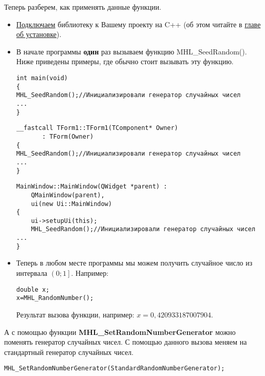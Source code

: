 Теперь разберем, как применять данные функции.

\begin{itemize}
\item \hyperref[section_install]{Подключаем} библиотеку к Вашему проекту на C++ (об этом читайте в \hyperref[section_install]{главе об установке}).
\item В начале программы \textbf{один} раз вызываем функцию MHL\_SeedRandom(). Ниже приведены примеры, где обычно стоит вызывать эту функцию.

\begin{lstlisting}[label=random_console,caption=Применение MHL\_SeedRandom для консольного приложения]
int main(void)
{
MHL_SeedRandom();//Инициализировали генератор случайных чисел
...
} 
\end{lstlisting}

\begin{lstlisting}[label=random_cbuilder,caption=Применение MHL\_SeedRandom для C++Builder]
__fastcall TForm1::TForm1(TComponent* Owner)
       : TForm(Owner)
{
MHL_SeedRandom();//Инициализировали генератор случайных чисел
...
}
\end{lstlisting}

\begin{lstlisting}[label=random_qt,caption=Применение MHL\_SeedRandom для Qt]
MainWindow::MainWindow(QWidget *parent) :
    QMainWindow(parent),
    ui(new Ui::MainWindow)
{
    ui->setupUi(this);
    MHL_SeedRandom();//Инициализировали генератор случайных чисел
...
}
\end{lstlisting}

\item Теперь в любом месте программы мы можем получить случайное число из интервала $ \left(0; 1\right]  $. Например:

\begin{lstlisting}[label=random_use,caption=Применение ГСЧ]
double x;
x=MHL_RandomNumber();
\end{lstlisting}

Результат вызова функции, например: $ x = 0,420933187007904 $.

\end{itemize}

А с помощью функции \textbf{MHL\_SetRandomNumberGenerator} можно поменять генератор случайных чисел. С помощью данного вызова меняем на стандартный генератор случайных чисел.
\begin{lstlisting}[label=SetRandomNumberGenerator,caption=Меняем на стандартный генератор случайных чисел]
MHL_SetRandomNumberGenerator(StandardRandomNumberGenerator);
\end{lstlisting}

